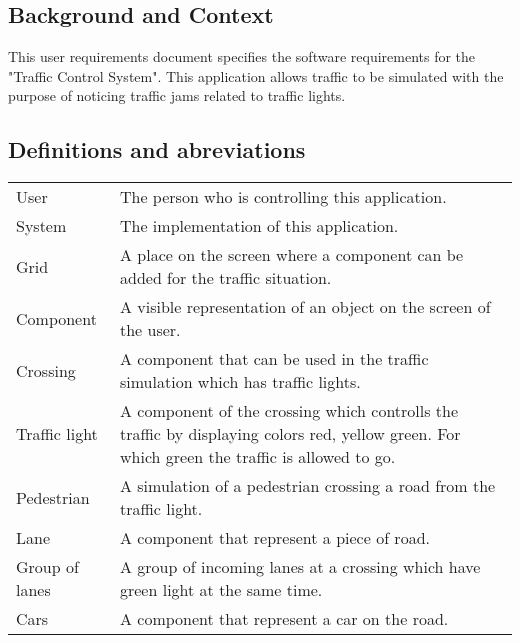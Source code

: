 \documentclass[a4paper,11pt]{article}
\title{\Title}
\author{}
\date{\today}
\begin{document}
\begin{titlepage}
\maketitle
\end{titlepage}

  	\linespread{1.15} %
    
  	\subsection*{Background and Context}
  	This user requirements document specifies the software requirements for the "Traffic Control System". This application allows traffic to be simulated with the purpose of noticing traffic jams related to traffic lights.
  	
  	\subsection*{Definitions and abreviations}
  	\begin{longtable}[l]{p{80pt} p{350pt}} 
  		User & The person who is controlling this application.\\
  		System & The implementation of this application.\\
  		Grid & A place on the screen where a component can be added for the traffic situation.\\
  		Component & A visible representation of an object on the screen of the user.\\
  		Crossing & A component that can be used in the traffic simulation which has traffic lights.\\
  		Traffic light & A component of the crossing which controlls the traffic by displaying colors red, yellow green. For which green the traffic is allowed to go.\\
  		Pedestrian & A simulation of a pedestrian crossing a road from the traffic light.\\
  		Lane & A component that represent a piece of road.\\
  		Group of lanes & A group of incoming lanes at a crossing which have green light at the same time.\\
  		Cars & A component that represent a car on the road.\\
  	\end{longtable}
  	
  	\tableofcontents
  	\newpage
  	
  	
  	
  	
    
    
    
    
\end{document}

